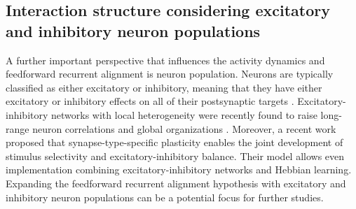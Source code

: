 \documentclass[11pt]{article}
\begin{document}
	\subsection*{Interaction structure considering excitatory and inhibitory neuron populations}
	A further important perspective that influences the activity dynamics and feedforward recurrent alignment is neuron population. Neurons are typically classified as either excitatory or inhibitory, meaning that they have either excitatory or inhibitory effects on all of their postsynaptic targets \cite{dayan2005theoretical}. Excitatory-inhibitory networks with local heterogeneity were recently found to raise long-range neuron correlations and global organizations \cite{dahmen2022global}. Moreover, a recent work \cite{eckmann2022synapse} proposed that synapse-type-specific plasticity enables the joint development of stimulus selectivity and excitatory-inhibitory balance. Their model allows even implementation combining excitatory-inhibitory networks and Hebbian learning. Expanding the feedforward recurrent alignment hypothesis with excitatory and inhibitory neuron populations can be a potential focus for further studies. 
	
\end{document}
